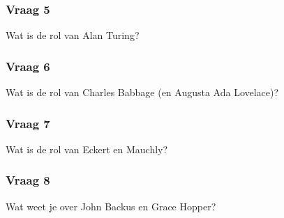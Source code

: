 \documentclass[../main.tex]{subfiles}
\begin{document}
\subsubsection{Vraag 5}
\begin{question}
Wat is de rol van Alan Turing?
\end{question}

\subsubsection{Vraag 6}
\begin{question}
Wat is de rol van Charles Babbage (en Augusta Ada Lovelace)?
\end{question}

\subsubsection{Vraag 7}
\begin{question}
Wat is de rol van Eckert en Mauchly?
\end{question}

\subsubsection{Vraag 8}
\begin{question}
Wat weet je over John Backus en Grace Hopper?
\end{question}
\end{document}
